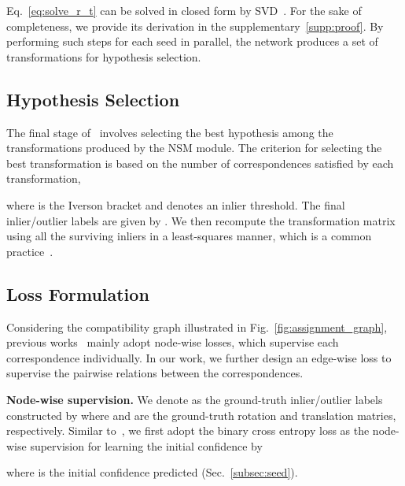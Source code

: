 Eq.~\ref{eq:solve_r_t} can be solved in closed form by SVD~\cite{besl1992method}. For the sake of completeness, {we provide} its derivation in the supplementary~\ref{supp:proof}. By {performing}
such steps for each seed {in parallel}, the network produces a set of transformations  for hypothesis selection.









\subsection{Hypothesis Selection}
\label{subsec:hypo_select}
The final stage of \Name~involves selecting the best hypothesis among the transformations produced by the NSM module. 
The criterion for selecting the best transformation is based on the number of correspondences satisfied by {each}
transformation, 

where  is the Iverson bracket and  denotes {an} inlier threshold. The final inlier/outlier labels  {are} given by . 
We then 
recompute the transformation matrix using all the surviving inliers in a least-squares manner, which is a common practice~\cite{chum2003locally, barath2018graph}. 






\subsection{Loss Formulation}


{Considering the compatibility graph illustrated in Fig.~\ref{fig:assignment_graph}, previous works~\cite{choy2020deep, pais20203dregnet} mainly adopt node-wise losses, which supervise each correspondence individually. In our work, we further design an edge-wise loss to supervise the pairwise relations between the correspondences.}

\noindent\textbf{Node-wise supervision.} We denote  as the ground-truth inlier/outlier labels constructed by 
 where  {and}  are the ground{-}truth rotation and translation matries, respectively.
Similar to~\cite{choy2020deep,pais20203dregnet}, we first adopt the binary cross entropy loss as the node-wise supervision for learning the initial confidence by 

where  is the initial confidence predicted (Sec.~\ref{subsec:seed}).




